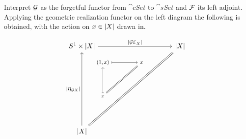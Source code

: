 \documentclass[../../main.tex]{subfiles}
\begin{document}
    Interpret $\functor{G}$ as the forgetful functor from $\cat{cSet}$ to $\cat{sSet}$ and $\functor{F}$ its left adjoint. Applying the geometric realization functor on the left diagram the following is obtained, with the action on $x \in \geom[X]$ drawn in.

    \begin{figure}[H]
        \[ 
            \stackinset{l}{10ex}{b}{13ex}{%
                \scalebox{.8}
                {%
                    \begin{tikzcd}[row sep=11ex, column sep = 11ex, ampersand replacement=\&]
                        (1,x)\arrow[mapsto]{r} \& x \arrow[dl,equal] \\
                        x \arrow[u,mapsto]
                    \end{tikzcd}
                }
            }{%
                \begin{tikzcd}[row sep = 25ex, column sep = 25ex, ampersand replacement=\&]
                    S^1 \times \geom[X] \arrow[r,"|\functor{G} \mathlarger{\varepsilon}_X|"] \& \geom[X] \\
                    \geom[X] \arrow[u,"|\mathlarger{\eta}_{\functor{G}X}|"] \arrow[ur, equal]
                \end{tikzcd}
            }
        \]
    \end{figure}
\end{document}
